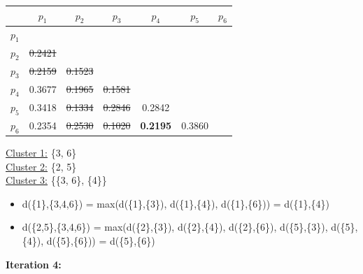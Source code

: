 \documentclass[11pt]{article}
\begin{document}
	\begin{center}
    	\begin{adjustbox}{max width=\textwidth}
		\begin{tabular}{ | c | c | c | c | c | c | c |}
	  	 	\hline

	  	 	& \textbf{$p_1$} & \textbf{$p_2$} & \textbf{$p_3$} & \textbf{$p_4$} & \textbf{$p_5$} & \textbf{$p_6$}\\
	  	 	\hline
	  	 	
	  	 	\textbf{$p_1$} &  &  &  &  &  &\\
	  	 	\hline
	  	 	
	  	 	\textbf{$p_2$} & \st{0.2421} &  &  &  &  &  \\
	  	 	\hline
	  	 	
	  	 	\textbf{$p_3$} & \st{0.2159} & \st{0.1523} &  &  &  & \\
	  	 	\hline
	  	 	
	  	 	\textbf{$p_4$} & 0.3677 & \st{0.1965} & \st{0.1581} &  &  & \\
	  	 	\hline
	  	 	
	  	 	\textbf{$p_5$} & 0.3418 & \st{0.1334} & \st{0.2846} & 0.2842 &  & \\
	  	 	\hline	
	  	 	
	  	 	\textbf{$p_6$} & 0.2354 & \st{0.2530} & \st{0.1020} & \textbf{0.2195} & 0.3860 & \\
	  	 	\hline			
    		\end{tabular}
    	\end{adjustbox}
	\end{center}
	
	\underline{Cluster 1:} \{3, 6\} \\
	\underline{Cluster 2:} \{2, 5\} \\
	\underline{Cluster 3:} \{\{3, 6\}, \{4\}\}
	
	\begin{itemize}
		\item d(\{1\},\{3,4,6\}) = max(d(\{1\},\{3\}), d(\{1\},\{4\}), d(\{1\},\{6\})) = d(\{1\},\{4\})
		\item d(\{2,5\},\{3,4,6\}) = max(d(\{2\},\{3\}), d(\{2\},\{4\}), d(\{2\},\{6\}), d(\{5\},\{3\}), d(\{5\},\{4\}), d(\{5\},\{6\})) = d(\{5\},\{6\})
	\end{itemize}
	
	\vspace{5mm}
	
	\textbf{Iteration 4:}
	
\end{document}
